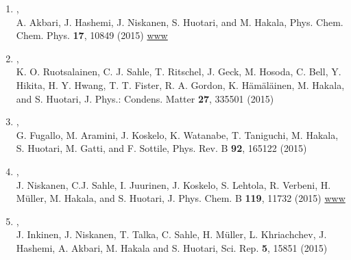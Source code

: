 \documentclass[12pt,a4]{report}
\begin{document}
\begin{enumerate}
\item{},\\
A. Akbari, J. Hashemi, J. Niskanen, S. Huotari, and M. Hakala, Phys. Chem. Chem. Phys. {\bf 17}, 10849 (2015) 
\href{http://pubs.rsc.org/en/content/articlelanding/2015/cp/c4cp05980h#!divAbstract}{www}

\item{},\\
K. O. Ruotsalainen, C. J. Sahle, T. Ritschel, J. Geck, M. Hosoda, C. Bell, Y. Hikita, H. Y. Hwang, T. T. Fister, R. A. Gordon, K. H{\"a}m{\"a}l{\"a}inen, M. Hakala, and S. Huotari, J. Phys.: Condens. Matter {\bf 27}, 335501 (2015)

\item{},\\
G. Fugallo, M. Aramini, J. Koskelo, K. Watanabe, T. Taniguchi, M. Hakala, S. Huotari, M. Gatti, and F. Sottile, Phys. Rev. B {\bf 92}, 165122 (2015)

\item{},\\
J. Niskanen, C.J. Sahle, I. Juurinen, J. Koskelo, S. Lehtola, R. Verbeni, H. M{\"u}ller, M. Hakala, and S. Huotari, J. Phys. Chem. B {\bf 119}, 11732 (2015)
\href{http://pubs.acs.org/doi/full/10.1021/acs.jpcb.5b04371}{www}

\item{},\\ 
J. Inkinen, J. Niskanen, T. Talka, C. Sahle, H. M{\"u}ller, L. Khriachchev, J. Hashemi, A. Akbari, 
M. Hakala and S. Huotari, Sci. Rep. {\bf 5}, 15851 (2015)



\end{enumerate}
\end{document}
